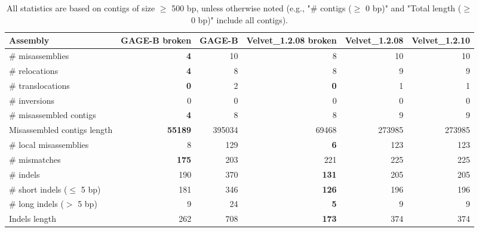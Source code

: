 \documentclass[12pt,a4paper]{article}
\begin{document}
\begin{table}[ht]
\begin{center}
\caption{All statistics are based on contigs of size $\geq$ 500 bp, unless otherwise noted (e.g., "\# contigs ($\geq$ 0 bp)" and "Total length ($\geq$ 0 bp)" include all contigs).}
\begin{tabular}{|l*{5}{|r}|}
\hline
Assembly & GAGE-B broken & GAGE-B & Velvet\_1.2.08 broken & Velvet\_1.2.08 & Velvet\_1.2.10 \\ \hline
\# misassemblies & {\bf 4} & 10 & 8 & 10 & 10 \\ \hline
\hspace{5mm}\# relocations & {\bf 4} & 8 & 8 & 9 & 9 \\ \hline
\hspace{5mm}\# translocations & {\bf 0} & 2 & {\bf 0} & 1 & 1 \\ \hline
\hspace{5mm}\# inversions & 0 & 0 & 0 & 0 & 0 \\ \hline
\# misassembled contigs & {\bf 4} & 8 & 8 & 9 & 9 \\ \hline
Misassembled contigs length & {\bf 55189} & 395034 & 69468 & 273985 & 273985 \\ \hline
\# local misassemblies & 8 & 129 & {\bf 6} & 123 & 123 \\ \hline
\# mismatches & {\bf 175} & 203 & 221 & 225 & 225 \\ \hline
\# indels & 190 & 370 & {\bf 131} & 205 & 205 \\ \hline
\hspace{5mm}\# short indels ($\leq$ 5 bp) & 181 & 346 & {\bf 126} & 196 & 196 \\ \hline
\hspace{5mm}\# long indels ($>$ 5 bp) & 9 & 24 & {\bf 5} & 9 & 9 \\ \hline
Indels length & 262 & 708 & {\bf 173} & 374 & 374 \\ \hline
\end{tabular}
\end{center}
\end{table}
\end{document}

